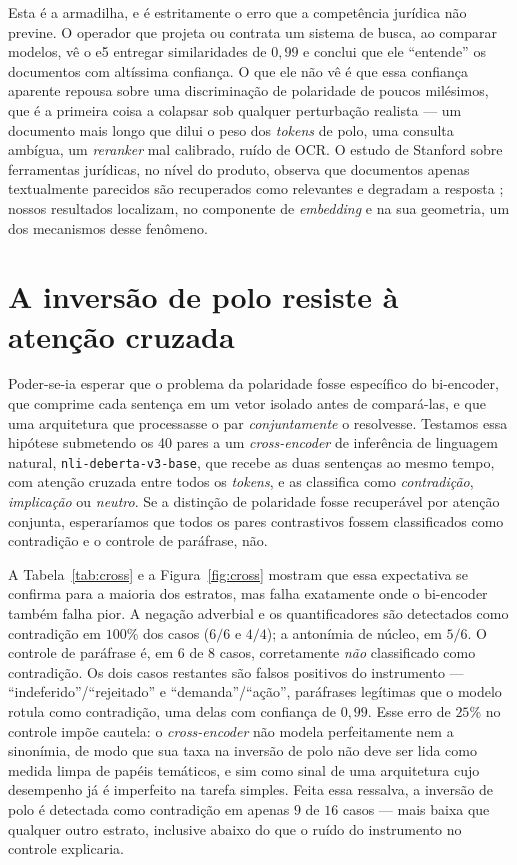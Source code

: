 \documentclass[11pt]{article}
\begin{document}
Esta é a armadilha, e é estritamente o erro que a competência jurídica não
previne. O operador que projeta ou contrata um sistema de busca, ao comparar
modelos, vê o e5 entregar similaridades de $0{,}99$ e conclui que ele ``entende''
os documentos com altíssima confiança. O que ele não vê é que essa confiança
aparente repousa sobre uma discriminação de polaridade de poucos milésimos, que é a
primeira coisa a colapsar sob qualquer perturbação realista --- um documento mais
longo que dilui o peso dos \textit{tokens} de polo, uma consulta ambígua, um
\textit{reranker} mal calibrado, ruído de OCR. O estudo de Stanford sobre
ferramentas jurídicas, no nível do produto, observa que documentos apenas
textualmente parecidos são recuperados como relevantes e degradam a resposta
\cite{magesh2025}; nossos resultados localizam, no componente de \textit{embedding}
e na sua geometria, um dos mecanismos desse fenômeno.

\section{A inversão de polo resiste à atenção cruzada}
\label{sec:cross}

Poder-se-ia esperar que o problema da polaridade fosse específico do bi-encoder,
que comprime cada sentença em um vetor isolado antes de compará-las, e que uma
arquitetura que processasse o par \emph{conjuntamente} o resolvesse. Testamos essa
hipótese submetendo os 40 pares a um \textit{cross-encoder} de inferência de
linguagem natural, \texttt{nli-deberta-v3-base}, que recebe as duas sentenças ao
mesmo tempo, com atenção cruzada entre todos os \textit{tokens}, e as classifica
como \emph{contradição}, \emph{implicação} ou \emph{neutro}. Se a distinção de
polaridade fosse recuperável por atenção conjunta, esperaríamos que todos os pares
contrastivos fossem classificados como contradição e o controle de paráfrase, não.

A Tabela~\ref{tab:cross} e a Figura~\ref{fig:cross} mostram que essa expectativa se
confirma para a maioria dos estratos, mas falha exatamente onde o bi-encoder
também falha pior. A negação adverbial e os quantificadores são detectados como
contradição em $100\%$ dos casos ($6/6$ e $4/4$); a antonímia de núcleo, em
$5/6$. O controle de paráfrase é, em $6$ de $8$ casos, corretamente \emph{não}
classificado como contradição. Os dois casos restantes são falsos positivos do
instrumento --- ``indeferido''/``rejeitado'' e ``demanda''/``ação'', paráfrases
legítimas que o modelo rotula como contradição, uma delas com confiança de
$0{,}99$. Esse erro de $25\%$ no controle impõe cautela: o \textit{cross-encoder}
não modela perfeitamente nem a sinonímia, de modo que sua taxa na inversão de polo
não deve ser lida como medida limpa de papéis temáticos, e sim como sinal de uma
arquitetura cujo desempenho já é imperfeito na tarefa simples. Feita essa ressalva,
a inversão de polo é detectada como contradição em apenas $9$ de $16$ casos ---
mais baixa que qualquer outro estrato, inclusive abaixo do que o ruído do
instrumento no controle explicaria.
\end{document}
